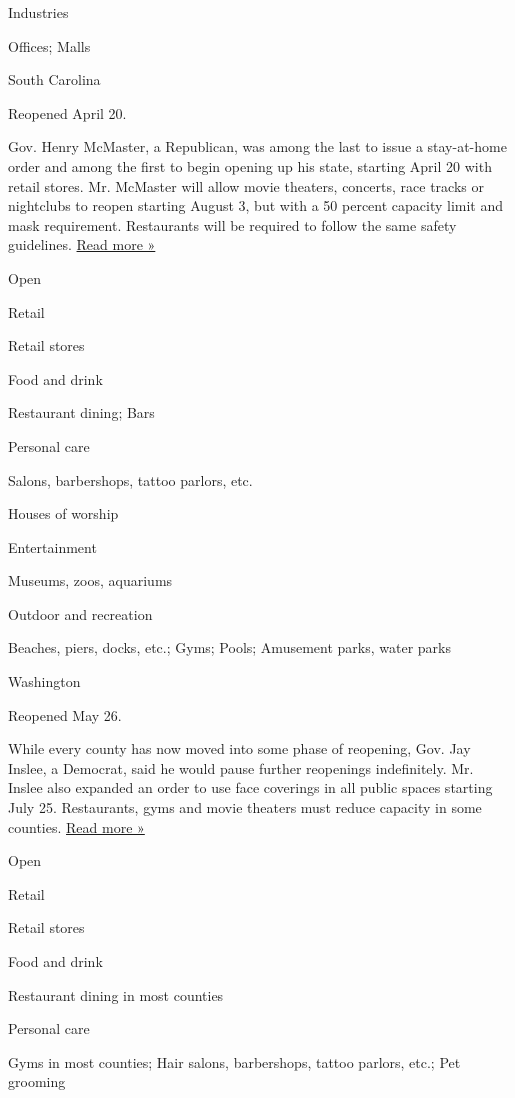 Industries

Offices; Malls

South Carolina

Reopened April 20.

Gov. Henry McMaster, a Republican, was among the last to issue a
stay-at-home order and among the first to begin opening up his state,
starting April 20 with retail stores. Mr. McMaster will allow movie
theaters, concerts, race tracks or nightclubs to reopen starting August
3, but with a 50 percent capacity limit and mask requirement.
Restaurants will be required to follow the same safety guidelines.
\href{https://www.wbtv.com/2020/07/29/sc-governor-announces-targeted-mask-requirements-reopens-more-businesses/}{Read
more »}

Open

Retail

Retail stores

Food and drink

Restaurant dining; Bars

Personal care

Salons, barbershops, tattoo parlors, etc.

Houses of worship

Entertainment

Museums, zoos, aquariums

Outdoor and recreation

Beaches, piers, docks, etc.; Gyms; Pools; Amusement parks, water parks

Washington

Reopened May 26.

While every county has now moved into some phase of reopening, Gov. Jay
Inslee, a Democrat, said he would pause further reopenings indefinitely.
Mr. Inslee also expanded an order to use face coverings in all public
spaces starting July 25. Restaurants, gyms and movie theaters must
reduce capacity in some counties.
\href{https://www.seattlepi.com/coronavirus/article/inslee-extends-phase-pause-indefinitely-wa-state-15441125.php}{Read
more »}

Open

Retail

Retail stores

Food and drink

Restaurant dining in most counties

Personal care

Gyms in most counties; Hair salons, barbershops, tattoo parlors, etc.;
Pet grooming


